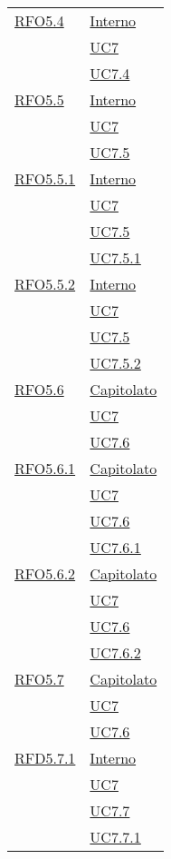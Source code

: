 \begin{longtable}{|>{\centering}m{5cm}|m{5cm}<{\centering}|}
\hyperlink{RFO5.4}{RFO5.4} 
& \hyperlink{Interno}{Interno}\\
& \hyperref[UC7]{UC7}\\
& \hyperref[UC7.4]{UC7.4}\\ \hline

\hyperlink{RFO5.5}{RFO5.5} 
& \hyperlink{Interno}{Interno}\\
& \hyperref[UC7]{UC7}\\
& \hyperref[UC7.5]{UC7.5}\\ \hline

\hyperlink{RFO5.5.1}{RFO5.5.1} 
& \hyperlink{Interno}{Interno}\\
& \hyperref[UC7]{UC7}\\
& \hyperref[UC7.5]{UC7.5}\\
& \hyperref[UC7.5.1]{UC7.5.1}\\ \hline

\hyperlink{RFO5.5.2}{RFO5.5.2} 
& \hyperlink{Interno}{Interno}\\
& \hyperref[UC7]{UC7}\\
& \hyperref[UC7.5]{UC7.5}\\
& \hyperref[UC7.5.2]{UC7.5.2}\\ \hline

\hyperlink{RFO5.6}{RFO5.6} 
& \hyperlink{Capitolato}{Capitolato}\\
& \hyperref[UC7]{UC7}\\
& \hyperref[UC7.6]{UC7.6}\\ \hline

\hyperlink{RFO5.6.1}{RFO5.6.1} 
& \hyperlink{Capitolato}{Capitolato}\\
& \hyperref[UC7]{UC7}\\
& \hyperref[UC7.6]{UC7.6}\\
& \hyperref[UC7.6.1]{UC7.6.1}\\ \hline

\hyperlink{RFO5.6.2}{RFO5.6.2} 
& \hyperlink{Capitolato}{Capitolato}\\
& \hyperref[UC7]{UC7}\\
& \hyperref[UC7.6]{UC7.6}\\
& \hyperref[UC7.6.2]{UC7.6.2}\\ \hline


\hyperlink{RFO5.7}{RFO5.7} 
& \hyperlink{Capitolato}{Capitolato}\\
& \hyperref[UC7]{UC7}\\
& \hyperref[UC7.6]{UC7.6}\\ \hline

\hyperlink{RFD5.7.1}{RFD5.7.1} 
& \hyperlink{Interno}{Interno}\\
& \hyperref[UC7]{UC7}\\
& \hyperref[UC7.7]{UC7.7}\\
& \hyperref[UC7.7.1]{UC7.7.1}\\ \hline


\end{longtable}
